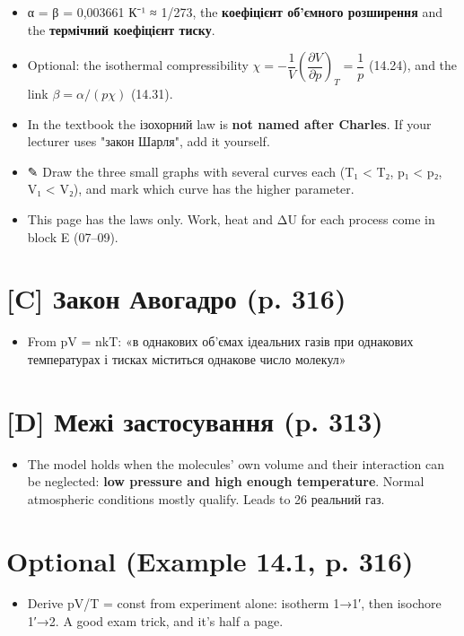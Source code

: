 \documentclass[11pt,a4paper,oneside]{book}
\newcommand{\pen}{{\sffamily\color{accent}✎}}
\begin{document}
\begin{itemize}
\item α = β = 0,003661 К⁻¹ ≈ 1/273, the \textbf{коефіцієнт об'ємного розширення} and the \textbf{термічний коефіцієнт тиску}.
\item Optional: the isothermal compressibility $\chi = -\dfrac1V\left(\dfrac{\partial V}{\partial p}\right)_T = \dfrac1p$ (14.24), and the link $\beta = \alpha/(p\chi)$ (14.31).
\item In the textbook the ізохорний law is \textbf{not named after Charles}. If your lecturer uses "закон Шарля", add it yourself.
\item \pen{} Draw the three small graphs with several curves each (T₁ < T₂, p₁ < p₂, V₁ < V₂), and mark which curve has the higher parameter.
\item This page has the laws only. Work, heat and ΔU for each process come in block E (07–09).
\end{itemize}

\section*{[C] Закон Авогадро (p. 316)}
\begin{itemize}
\item From pV = nkT: «в однакових об'ємах ідеальних газів при однакових температурах і тисках міститься однакове число молекул»
\end{itemize}

\section*{[D] Межі застосування (p. 313)}
\begin{itemize}
\item The model holds when the molecules' own volume and their interaction can be neglected: \textbf{low pressure and high enough temperature}. Normal atmospheric conditions mostly qualify. Leads to 26 реальний газ.
\end{itemize}

\section*{Optional (Example 14.1, p. 316)}
\begin{itemize}
\item Derive pV/T = const from experiment alone: isotherm 1→1′, then isochore 1′→2. A good exam trick, and it's half a page.
\end{itemize}
\end{document}
